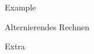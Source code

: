 \documentclass{exsheetans}
\author{Author Name} %
\begin{document}
\begin{quiz}
	\item %
\end{quiz}
\begin{answer}[8]{Example}
\end{answer}

\begin{answer}[7]{Alternierendes Rechnen}
	\begin{subanswer}
	\end{subanswer}
	\begin{subanswer}
	\end{subanswer}
\end{answer}
\begin{extra}[10]{Extra}
\end{extra}
\end{document}
